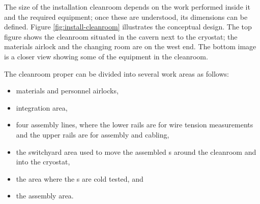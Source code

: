 The size of the installation cleanroom depends on the work performed inside it and the required equipment; once these are understood, its dimensions can be defined.  Figure \ref{fig:install-cleanroom} illustrates  the conceptual design. The top figure shows the cleanroom situated in the cavern next to the cryostat; the materials airlock and the changing room are on the west end. The bottom image is a closer view showing some of the equipment in the cleanroom. 





The cleanroom proper can be divided into several work areas as follows:
\begin{itemize}
\setlength\itemsep{1mm}
\setlength{\parsep}{1mm}
\setlength{\itemsep}{-5mm}
    \item materials and personnel airlocks,
    \item {} integration area,
    \item four  assembly lines, where the lower rails are for wire tension measurements and the upper rails are for  assembly and cabling,
    \item the switchyard area used to move the assembled s around the cleanroom and into the cryostat,
    \item the \coldbox area where the s are cold tested, and
    \item the  assembly area.
\end{itemize}


